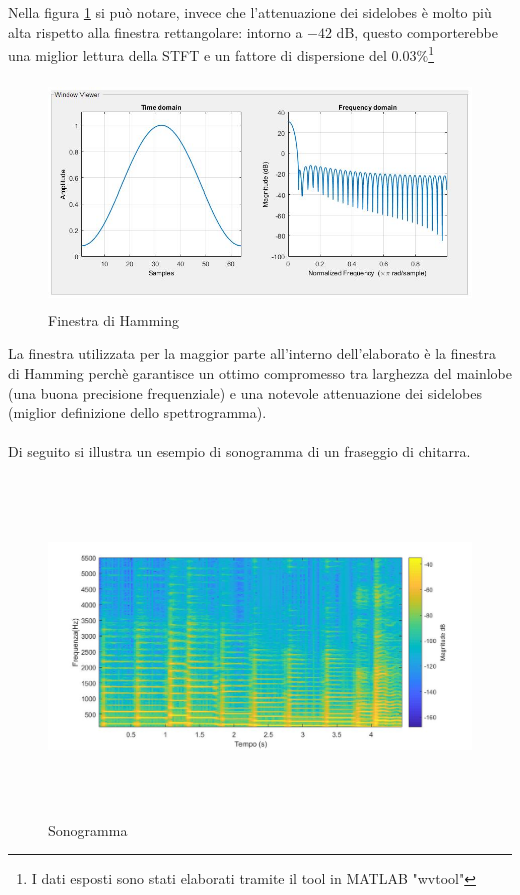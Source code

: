 \documentclass[12pt]{report}
\begin{document}
Nella figura \ref{fig:hamming_fun} si può notare, invece che l'attenuazione dei sidelobes è molto più alta rispetto alla finestra rettangolare: intorno a $-42$ dB, questo comporterebbe una miglior lettura della STFT e un fattore di dispersione del $0.03\%$\footnote{I dati esposti sono stati elaborati tramite il tool in MATLAB "wvtool"}

\begin{figure}[htbp]
\centerline{\includegraphics[height=60mm]{img/hamming_fun}}
\caption{Finestra di Hamming}
\label{fig:hamming_fun}
\end{figure}

\clearpage

La finestra utilizzata per la maggior parte all'interno dell'elaborato è la finestra di Hamming perchè garantisce un ottimo compromesso tra larghezza del mainlobe (una buona precisione frequenziale) e una notevole attenuazione dei sidelobes (miglior definizione dello spettrogramma).
\\\\

Di seguito si illustra un esempio di sonogramma di un fraseggio di chitarra.
\begin{figure}[htbp]
\centerline{\includegraphics[height=90mm]{img/sonogram}}
\caption{Sonogramma}
\label{fig:sonogram}
\end{figure}
\end{document}
